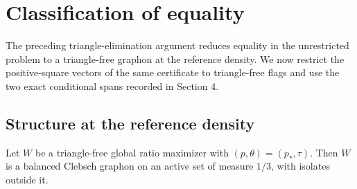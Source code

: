 \section{Classification of equality}
\label{sec:equality}

The preceding triangle-elimination argument reduces equality in the
unrestricted problem to a triangle-free graphon at the reference density.
We now restrict the positive-square vectors of the same certificate to
triangle-free flags and use the two exact conditional spans recorded in
Section 4.

\subsection{Structure at the reference density}

\begin{proposition}\label{prop:reference-equality}
Let $W$ be a triangle-free global ratio maximizer with
$(p,\theta)=(p_\ast,\tau)$. Then $W$ is a balanced Clebsch graphon on an
active set of measure $1/3$, with isolates outside it.
\end{proposition}

